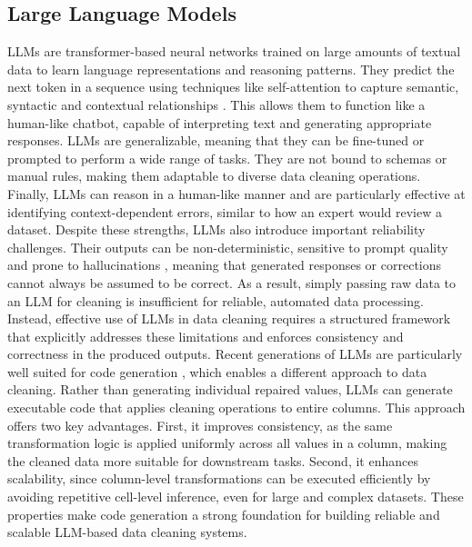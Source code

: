 \subsection{Large Language Models}
LLMs are transformer-based neural networks trained on large amounts of textual data to learn language representations and reasoning patterns. 
They predict the next token in a sequence using techniques like self-attention to capture semantic, syntactic and contextual relationships \cite{COMPREHENSIVE}. 
This allows them to function like a human-like chatbot, capable of interpreting text and generating appropriate responses.
LLMs are generalizable, meaning that they can be fine-tuned or prompted to perform a wide range of tasks. 
They are not bound to schemas or manual rules, making them adaptable to diverse data cleaning operations. 
Finally, LLMs can reason in a human-like manner and are particularly effective at identifying context-dependent errors, similar to how an expert would review a dataset.
\newline\newline
Despite these strengths, LLMs also introduce important reliability challenges. 
Their outputs can be non-deterministic, sensitive to prompt quality and prone to hallucinations \cite{AIALIGN}, meaning that generated responses or corrections cannot always be assumed to be correct. 
As a result, simply passing raw data to an LLM for cleaning is insufficient for reliable, automated data processing. 
Instead, effective use of LLMs in data cleaning requires a structured framework that explicitly addresses these limitations and enforces consistency and correctness in the produced outputs.
\newline\newline
Recent generations of LLMs are particularly well suited for code generation \cite{LLMCODE}, which enables a different approach to data cleaning. 
Rather than generating individual repaired values, LLMs can generate executable code that applies cleaning operations to entire columns. 
This approach offers two key advantages. 
First, it improves consistency, as the same transformation logic is applied uniformly across all values in a column, making the cleaned data more suitable for downstream tasks. 
Second, it enhances scalability, since column-level transformations can be executed efficiently by avoiding repetitive cell-level inference, even for large and complex datasets. 
These properties make code generation a strong foundation for building reliable and scalable LLM-based data cleaning systems.

